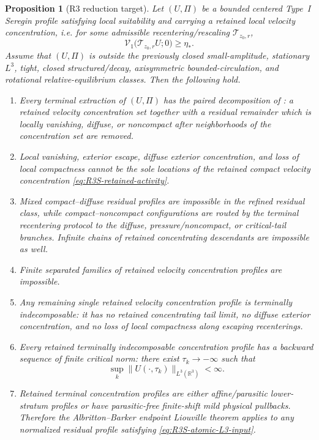 \documentclass[11pt]{amsart}
\numberwithin{equation}{section}
\theoremstyle{plain}
\newtheorem{proposition}[proposition]{Proposition}
\theoremstyle{definition}
\theoremstyle{remark}
\newcommand{\Vel}{\mathcal V}
\begin{document}
\begin{proposition}[R3 reduction target]
\label{thm:R3S-terminal-theorem}
Let \((U,\Pi)\) be a bounded centered Type~I Seregin profile satisfying local
suitability and carrying a retained local velocity concentration, i.e. for some
admissible recentering/rescaling \(\mathscr T_{z_0,r}\),
\begin{equation}\label{eq:R3S-retained-activity}
   \Vel_1\bigl(\mathscr T_{z_0,r}U;0\bigr)
   \ge \eta_* .
\end{equation}
Assume that \((U,\Pi)\) is outside the previously closed small-amplitude,
stationary \(L^3\), tight, closed structured/decay, axisymmetric
bounded-circulation, and rotational relative-equilibrium classes.  Then the
following hold.
\begin{enumerate}[label=(\roman*)]
   \item Every terminal extraction of \((U,\Pi)\) has the paired decomposition
   of : a retained velocity concentration set
   together with a residual remainder which is locally vanishing, diffuse, or
   noncompact after neighborhoods of the concentration set are removed.
   \item Local vanishing, exterior escape, diffuse exterior concentration, and
   loss of local compactness cannot be the sole locations of the retained
   compact velocity concentration
   \eqref{eq:R3S-retained-activity}.
   \item Mixed compact--diffuse residual profiles are impossible in the refined
   residual class, while compact--noncompact configurations are routed by the
   terminal recentering protocol to the diffuse, pressure/noncompact, or
   critical-tail branches.  Infinite chains of retained concentrating
   descendants are impossible as well.
   \item Finite separated families of retained velocity concentration profiles are
   impossible.
   \item Any remaining single retained velocity concentration profile is terminally
   indecomposable: it has no retained concentrating tail limit, no diffuse
   exterior concentration, and no loss of local compactness along escaping
   recenterings.
   \item Every retained terminally indecomposable concentration profile has a
   backward sequence of finite critical norm: there exist
   \(\tau_k\to-\infty\) such that
   \begin{equation}\label{eq:R3S-atomic-L3-input}
      \sup_k \|U(\cdot,\tau_k)\|_{L^3(\mathbb R^3)}<\infty .
   \end{equation}
   \item Retained terminal concentration profiles are either affine/parasitic
   lower-stratum profiles or have parasitic-free finite-shift mild physical
   pullbacks.  Therefore the Albritton--Barker endpoint Liouville theorem
   applies to any normalized residual profile satisfying
   \eqref{eq:R3S-atomic-L3-input}.
\end{enumerate}
\end{proposition}
\end{document}
